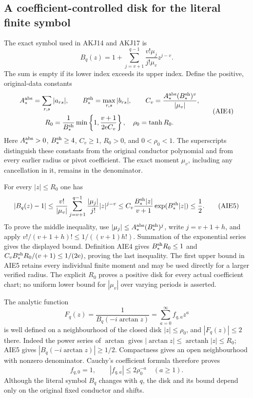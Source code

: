 \documentclass[11pt,a4paper]{article}
\begin{document}
\subsection{A coefficient-controlled disk for the literal finite symbol}

The exact symbol used in AKJ14 and AKJ17 is
\[
 B_q(z)=1+\sum_{j=v+1}^{q-1}
                \frac{v!\mu_j}{j!\mu_v}z^{j-v}.
 \tag{AIE3}
\]
The sum is empty if its lower index exceeds its upper index. Define
the positive, original-data constants
\[
 \begin{gathered}
 A_*^{\rm abs}=\sum_{r,s}|a_{rs}|,\qquad
 B_*^{\rm sh}=\max_{r,s}|b_{rs}|,\qquad
 C_v=\frac{A_*^{\rm abs}(B_*^{\rm sh})^v}{|\mu_v|},\\
 R_0=\frac{1}{B_*^{\rm sh}}
       \min\left\{1,\frac{v+1}{2\mathrm e C_v}\right\},
 \quad \rho_0=\tanh R_0.
 \end{gathered}\tag{AIE4}
\]
Here $A_*^{\rm abs}>0$, $B_*^{\rm sh}\ge4$, $C_v\ge1$,
$R_0>0$, and $0<\rho_0<1$. The superscripts distinguish these
constants from the original conductor polynomial and from every
earlier radius or pivot coefficient. The exact moment $\mu_v$,
including any cancellation in it, remains in the denominator.

For every $|z|\le R_0$ one has
\[
 |B_q(z)-1|
 \le \frac{v!}{|\mu_v|}
       \sum_{j=v+1}^{q-1}\frac{|\mu_j|}{j!}|z|^{j-v}
 \le C_v\frac{B_*^{\rm sh}|z|}{v+1}
                    \exp(B_*^{\rm sh}|z|)
 \le\frac12.
 \tag{AIE5}
\]
To prove the middle inequality, use
$|\mu_j|\le A_*^{\rm abs}(B_*^{\rm sh})^j$, write
$j=v+1+h$, and apply
$v!/(v+1+h)!\le1/((v+1)h!)$. Summation of the exponential
series gives the displayed bound. Definition AIE4 gives
$B_*^{\rm sh}R_0\le1$ and
$C_v B_*^{\rm sh}R_0/(v+1)\le1/(2\mathrm e)$, proving
the last inequality. The first upper bound in AIE5 retains every
individual finite moment and may be used directly for a larger
verified radius. The explicit $R_0$ proves a positive disk for
every actual coefficient chart; no uniform lower bound for
$|\mu_v|$ over varying periods is asserted.

The analytic function
\[
 F_q(z)=\frac1{B_q(-i\arctan z)}
          =\sum_{a=0}^\infty f_{q,a}z^a
 \tag{AIE6}
\]
is well defined on a neighbourhood of the closed disk
$|z|\le\rho_0$, and
$|F_q(z)|\le2$ there. Indeed the power series of $\arctan$
gives $|\arctan z|\le\operatorname{arctanh}|z|\le R_0$;
AIE5 gives $|B_q(-i\arctan z)|\ge1/2$. Compactness gives
an open neighbourhood with nonzero denominator. Cauchy's coefficient
formula therefore proves
\[
 f_{q,0}=1,\qquad |f_{q,a}|\le2\rho_0^{-a}
                    \quad(a\ge1).
 \tag{AIE7}
\]
Although the literal symbol $B_q$ changes with $q$, the disk and its
bound depend only on the original fixed conductor and shifts.
\end{document}
